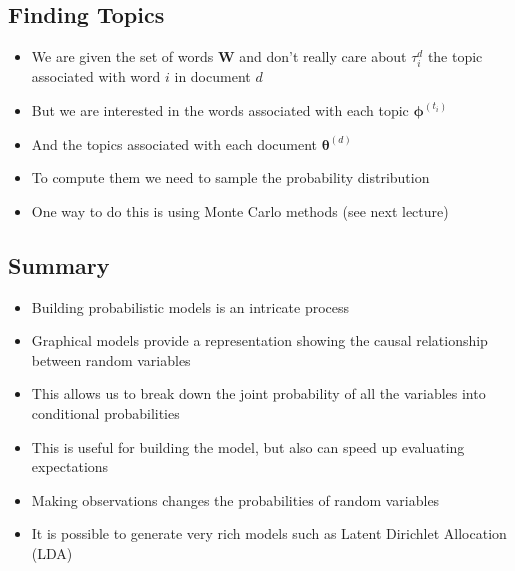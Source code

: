 \begin{slide}
\section{Finding Topics}

\begin{PauseHighLight}
  \begin{itemize}
  \item We are given the set of words $\bm{W}$ and don't really care
    about $\tau_i^d$ the topic associated with word $i$ in document
    $d$\pause
  \item But we are interested in the words associated with each topic
    $\bm{\phi}^{(t_i)}$\pause
  \item And the topics associated with each document
    $\bm{\theta}^{(d)}$\pause
  \item To compute them we need to sample the probability
    distribution\pause
  \item One way to do this is using Monte Carlo methods (see next
    lecture)\pause 
  \end{itemize}
\end{PauseHighLight}

\end{slide}



\begin{slide}
\section[-2]{Summary}

\begin{PauseHighLight}
  \begin{itemize}
  \item Building probabilistic models is an intricate process\pause
  \item Graphical models provide a representation showing the causal
    relationship between random variables\pause
  \item This allows us to break down the joint probability of all the
    variables into conditional probabilities\pause
  \item This is useful for building the model, but also can speed up
    evaluating expectations\pause
  \item Making observations changes the probabilities of random variables\pause
  \item It is possible to generate very rich models such as Latent
    Dirichlet Allocation (LDA)\pause
  \end{itemize}
\end{PauseHighLight}

\end{slide}


